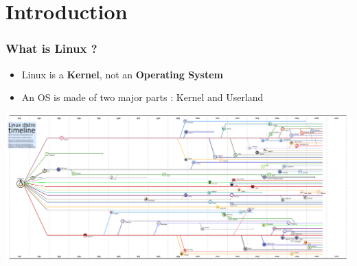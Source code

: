 \section*{Introduction}

\begin{frame}
    \frametitle{What is Linux ?}
        \begin{itemize}
            \item Linux is a \textbf{Kernel}, not an \textbf{Operating System}
	    \item An OS is made of two major parts : Kernel and Userland
        \end{itemize}
\end{frame}

\begin{frame}
        \begin{center}
            \includegraphics[width=\linewidth, height=\textheight, keepaspectratio]{linux_timeline.png}
        \end{center}
\end{frame}
